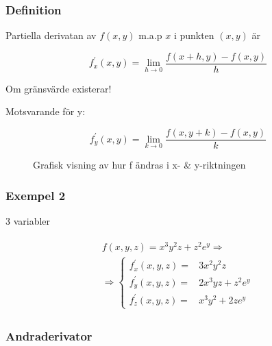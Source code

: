 \documentclass{article}
\begin{document}
\subsubsection{Definition}

Partiella derivatan av \(f(x,y)\) m.a.p \(x\) i punkten \((x,y)\) är

\[
	f^{\prime}_{x}(x,y) = \lim_{h \rightarrow 0} \frac{f(x+h,y) - f(x,y)}{h}
\]

Om gränsvärde existerar! \newline

Motsvarande för y:

\[
	f^{\prime}_{y}(x,y) = \lim_{k \rightarrow 0} \frac{f(x,y+k) - f(x,y)}{k}
\]

\begin{figure}[ht] 
  \caption{Grafisk visning av hur f ändras i x- \& y-riktningen} \label{fig:3.1}
\end{figure}

\subsubsection{Exempel 2}

3 variabler

\begin{align*}
\begin{split}
	f(x,y,z) = x^3y^2z+z^2e^y \Rightarrow \\
	\Rightarrow \left\{\begin{array}{rcl}
		f_{x}^{\prime}(x,y,z) = & 3x^2y^2z \\
		f_{y}^{\prime}(x,y,z) = & 2x^3yz+z^2e^y \\
		f_{z}^{\prime}(x,y,z) = & x^3y^2+2ze^y
	\end{array}\right.
\end{split}
\end{align*}

\subsubsection{Andraderivator}
\end{document}
